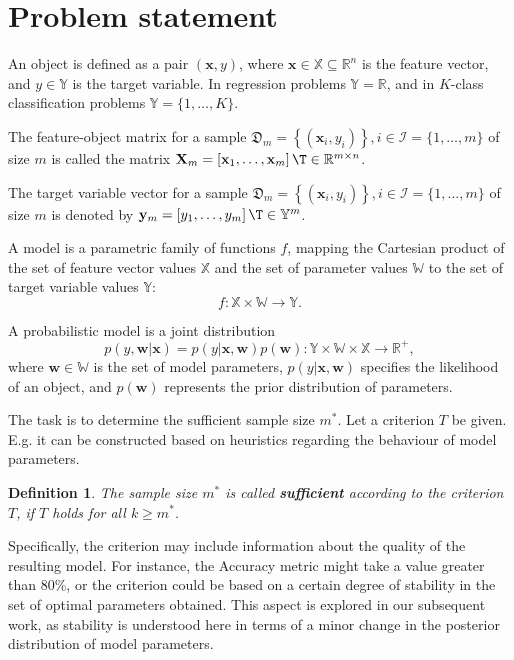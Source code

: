 \documentclass[sn-mathphys-num]{sn-jnl}%
\newtheorem{definition}{Definition}%
\begin{document}
\section{Problem statement}
An object is defined as a pair $(\mathbf{x}, y)$, where $\mathbf{x} \in \mathbb{X} \subseteq \mathbb{R}^n$ is the feature vector, and $y \in \mathbb{Y}$ is the target variable. In regression problems $\mathbb{Y} = \mathbb{R}$, and in $K$-class classification problems $\mathbb{Y} = \{1, \ldots, K\}$.

The feature-object matrix for a sample $\mathfrak{D}_m = \left\{ (\mathbf{x}_i, y_i) \right\}, i \in \mathcal{I} = \{ 1, \ldots, m \}$ of size $m$ is called the matrix $\mathbf{X}_m = \left[ \mathbf{x}_1, \ldots, \mathbf{x}_m \right]\T \in \mathbb{R}^{m \times n}$.

The target variable vector for a sample $\mathfrak{D}_m = \left\{ (\mathbf{x}_i, y_i) \right\}, i \in \mathcal{I} = \{ 1, \ldots, m \}$ of size $m$ is denoted by $\mathbf{y}_m = \left[ y_1, \ldots, y_m \right]\T \in \mathbb{Y}^m$.

A model is a parametric family of functions $f$, mapping the Cartesian product of the set of feature vector values $\mathbb{X}$ and the set of parameter values $\mathbb{W}$ to the set of target variable values $\mathbb{Y}$: 
\[ f: \mathbb{X} \times \mathbb{W} \to \mathbb{Y}. \]

A probabilistic model is a joint distribution
\[ p(y, \mathbf{w} | \mathbf{x}) = p(y | \mathbf{x}, \mathbf{w}) p(\mathbf{w}): \mathbb{Y} \times \mathbb{W} \times \mathbb{X} \to \mathbb{R}^+, \]
where $\mathbf{w} \in \mathbb{W}$ is the set of model parameters, $p(y | \mathbf{x}, \mathbf{w})$ specifies the likelihood of an object, and $p(\mathbf{w})$ represents the prior distribution of parameters.

The task is to determine the sufficient sample size $m^*$. Let a criterion $T$ be given. E.g. it can be constructed based on heuristics regarding the behaviour of model parameters.
\begin{definition}
    The sample size $m^*$ is called \textbf{sufficient} according to the criterion $T$, if $T$ holds for all $k \geqslant m^*$.
\end{definition}

Specifically, the criterion may include information about the quality of the resulting model. For instance, the Accuracy metric might take a value greater than 80\%, or the criterion could be based on a certain degree of stability in the set of optimal parameters obtained. This aspect is explored in our subsequent work, as stability is understood here in terms of a minor change in the posterior distribution of model parameters.
\end{document}

